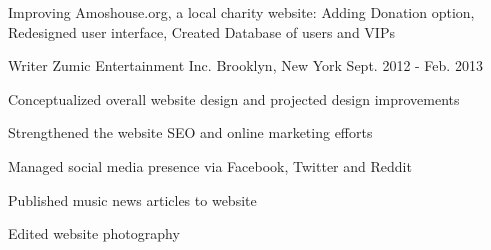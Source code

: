 \begin{cventries}
{\begin{cvitems}
        \item{Improving Amoshouse.org, a local charity website: Adding Donation option, Redesigned user interface, Created Database of users and VIPs}
      \end{cvitems}
    }
  \cventry
    {Writer}
    {Zumic Entertainment Inc.}
    {Brooklyn, New York}
    {Sept. 2012 - Feb. 2013}
    {
      \begin{cvitems}
      \item{Conceptualized overall website design and projected design improvements}
      \item{Strengthened the website SEO and online marketing efforts}
      \item{Managed social media presence via Facebook, Twitter and Reddit}
      \item{Published music news articles to website}
      \item{Edited website photography}
      \end{cvitems}
    }
\end{cventries}
